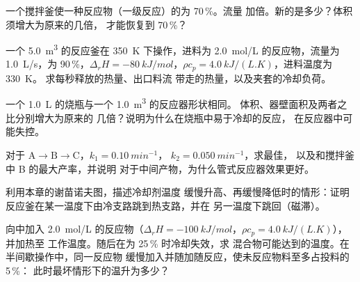 \begin{exercise}[$\star\star$]\label{exo:b2:continuous-reactors:7}
一个搅拌釜使一种反应物（一级反应）的为 70\,\%。流量
加倍。新的是多少？体积须增大为原来的几倍，
才能恢复到 70\,\%？
\end{exercise}

\begin{exercise}[$\star\star$]\label{exo:b2:continuous-reactors:8}
一个 \qty{5.0}{m^3} 的反应釜在 \qty{350}{K} 下操作，进料为
\qty{2.0}{mol/L} 的反应物，流量为 \qty{1.0}{L/s}，为 90\,\%，$\Delta_r H
= \qty{-80}{kJ/mol}$，$\rho c_p = \qty{4.0}{kJ/(L.K)}$，进料温度为 \qty{330}{K}。
求每秒释放的热量、出口料流
带走的热量，以及夹套的冷却负荷。
\end{exercise}

\begin{exercise}[$\star\star$]\label{exo:b2:continuous-reactors:9}
一个 \qty{1.0}{L} 的烧瓶与一个 \qty{1.0}{m^3} 的反应器形状相同。
体积、器壁面积及两者之比分别增大为原来的
几倍？说明为什么在烧瓶中易于冷却的反应，
在反应器中可能失控。
\end{exercise}

\begin{exercise}[$\star\star\star$]\label{exo:b2:continuous-reactors:10}
对于 $\mathrm A \to \mathrm B \to \mathrm C$，$k_1 = \qty{0.10}{min^{-1}}$，
$k_2 = \qty{0.050}{min^{-1}}$，求最佳，
以及和搅拌釜中 B 的最大产率，并说明
对于中间产物，为什么管式反应器效果更好。
\end{exercise}

\begin{exercise}[$\star\star\star$]\label{exo:b2:continuous-reactors:11}
利用本章的谢苗诺夫图，描述冷却剂温度
缓慢升高、再缓慢降低时的情形：证明
反应釜在某一温度下由冷支路跳到热支路，并在
另一温度下跳回（磁滞）。
\end{exercise}

\begin{exercise}[$\star\star\star$]\label{exo:b2:continuous-reactors:12}
向中加入 \qty{2.0}{mol/L} 的反应物（$\Delta_r H =
\qty{-100}{kJ/mol}$，$\rho c_p = \qty{4.0}{kJ/(L.K)}$），并加热至
工作温度。随后在为 25\,\% 时冷却失效，求
混合物可能达到的温度。在半间歇操作中，同一反应物
缓慢加入并随加随反应，使未反应物料至多占投料的 5\,\%：
此时最坏情形下的温升为多少？
\end{exercise}

